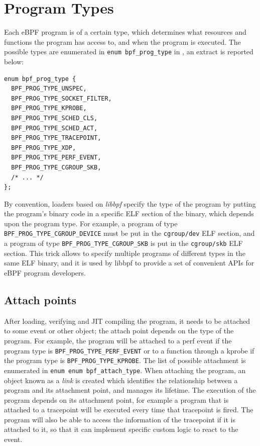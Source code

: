 \section{Program Types}

Each eBPF program is of a certain type, which determines what resources and
functions the program has access to, and when the program is executed. The
possible types are enumerated in \verb|enum bpf_prog_type| in
, an extract is reported below:

\begin{verbatim}
enum bpf_prog_type {
  BPF_PROG_TYPE_UNSPEC,
  BPF_PROG_TYPE_SOCKET_FILTER,
  BPF_PROG_TYPE_KPROBE,
  BPF_PROG_TYPE_SCHED_CLS,
  BPF_PROG_TYPE_SCHED_ACT,
  BPF_PROG_TYPE_TRACEPOINT,
  BPF_PROG_TYPE_XDP,
  BPF_PROG_TYPE_PERF_EVENT,
  BPF_PROG_TYPE_CGROUP_SKB,
  /* ... */
};
\end{verbatim}

By convention, loaders based on \textit{libbpf} specify the type of the program
by putting the program's binary code in a specific ELF section of the binary,
which depends upon the program type. For example, a program of type
\verb|BPF_PROG_TYPE_CGROUP_DEVICE| must be put in the \verb|cgroup/dev| ELF
section, and a program of type \verb|BPF_PROG_TYPE_CGROUP_SKB| is put in the
\verb|cgroup/skb| ELF section. This trick allows to specify multiple programs of
different types in the same ELF binary, and it is used by libbpf to provide a
set of convenient APIs for eBPF program developers.

\subsection{Attach points}

After loading, verifying and JIT compiling the program, it needs to be attached
to some event or other object; the attach point depends on the type of the
program. For example, the program will be attached to a perf event if the
program type is \verb|BPF_PROG_TYPE_PERF_EVENT| or to a function through a
kprobe if the program type is \verb|BPF_PROG_TYPE_KPROBE|. The list of possible
attachment is enumerated in \verb|enum enum bpf_attach_type|. When attaching the
program, an object known as a \textit{link} is created which identifies the
relationship between a program and its attachment point, and manages its
lifetime. The execution of the program depends on its attachment point, for
example a program that is attached to a tracepoint will be executed every time
that tracepoint is fired. The program will also be able to access the
information of the tracepoint if it is attached to it, so that it can implement
specific custom logic to react to the event.

